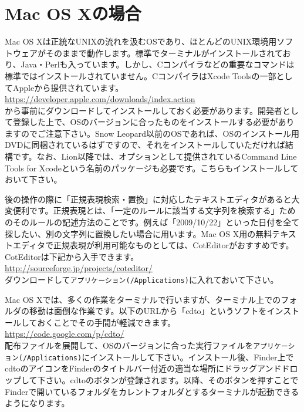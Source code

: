 \documentclass[titlepage,10pt,a4paper]{jsbook}
\begin{document}
\section{Mac OS Xの場合}

Mac OS Xは正統なUNIXの流れを汲むOSであり、ほとんどのUNIX環境用ソフトウェアがそのままで動作します。標準でターミナルがインストールされており、Java・Perlも入っています。しかし、Cコンパイラなどの重要なコマンドは標準ではインストールされていません。CコンパイラはXcode Toolsの一部としてAppleから提供されています。\\
\href{https://developer.apple.com/downloads/index.action}{https://developer.apple.com/downloads/index.action}\\
から事前にダウンロードしてインストールしておく必要があります。開発者として登録した上で、OSのバージョンに合ったものをインストールする必要がありますのでご注意下さい。Snow Leopard以前のOSであれば、OSのインストール用DVDに同梱されているはずですので、それをインストールしていただければ結構です。なお、Lion以降では、オプションとして提供されているCommand Line Tools for Xcodeという名前のパッケージも必要です。こちらもインストールしておいて下さい。

後の操作の際に「正規表現検索・置換」に対応したテキストエディタがあると大変便利です。正規表現とは、「一定のルールに該当する文字列を検索する」ためのそのルールの記述方法のことです。例えば「2009/10/22」といった日付を全て探したい、別の文字列に置換したい場合に用います。Mac OS X用の無料テキストエディタで正規表現が利用可能なものとしては、CotEditorがおすすめです。CotEditorは下記から入手できます。\\
\href{http://sourceforge.jp/projects/coteditor/}{http://sourceforge.jp/projects/coteditor/}\\
ダウンロードして\texttt{アプリケーション(/Applications)}に入れておいて下さい。

Mac OS Xでは、多くの作業をターミナルで行いますが、ターミナル上でのフォルダの移動は面倒な作業です。以下のURLから「cdto」というソフトをインストールしておくことでその手間が軽減できます。\\
\href{https://code.google.com/p/cdto/}{https://code.google.com/p/cdto/}\\
配布ファイルを展開して、OSのバージョンに合った実行ファイルを\texttt{アプリケーション(/Applications)}にインストールして下さい。インストール後、Finder上でcdtoのアイコンをFinderのタイトルバー付近の適当な場所にドラッグアンドドロップして下さい。cdtoのボタンが登録されます。以降、そのボタンを押すことでFinderで開いているフォルダをカレントフォルダとするターミナルが起動できるようになります。
\end{document}
